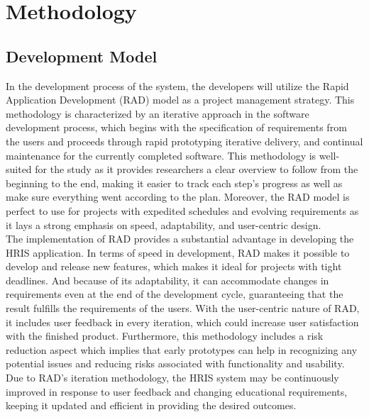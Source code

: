 \chapter{Methodology}

\section{Development Model}
In the development process of the system, the developers will utilize the Rapid Application Development (RAD) model as a project management strategy. This methodology is characterized by an iterative approach in the software development process, which begins with the specification of requirements from the users and proceeds through rapid prototyping iterative delivery, and continual maintenance for the currently completed software. This methodology is well-suited for the study as it provides researchers a clear overview to follow from the beginning to the end, making it easier to track each step's progress as well as make sure everything went according to the plan. Moreover, the RAD model is perfect to use for projects with expedited schedules and evolving requirements as it lays a strong emphasis on speed, adaptability, and user-centric design. 
\\

The implementation of RAD provides a substantial advantage in developing the HRIS application. In terms of speed in development, RAD makes it possible to develop and release new features, which makes it ideal for projects with tight deadlines. And because of its adaptability, it can accommodate changes in requirements even at the end of the development cycle, guaranteeing that the result fulfills the requirements of the users. With the user-centric nature of RAD, it includes user feedback in every iteration, which could increase user satisfaction with the finished product. Furthermore, this methodology includes a risk reduction aspect which implies that early prototypes can help in recognizing any potential issues and reducing risks associated with functionality and usability. Due to RAD's iteration methodology, the HRIS system may be continuously improved in response to user feedback and changing educational requirements, keeping it updated and efficient in providing the desired outcomes.

